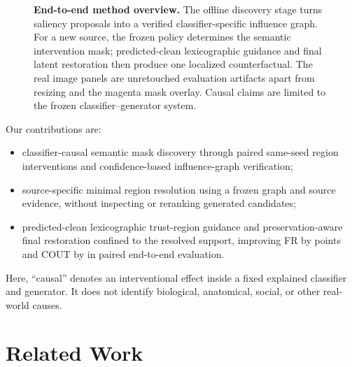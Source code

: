 \documentclass[10pt,twocolumn]{article}
\begin{document}
\begin{figure}[t]
{%
}
\caption{\textbf{End-to-end method overview.} The offline discovery stage
turns saliency proposals into a verified classifier-specific influence graph.
For a new source, the frozen policy determines the semantic intervention mask;
predicted-clean lexicographic guidance and final latent restoration then
produce one localized counterfactual. The real image panels are unretouched
evaluation artifacts apart from resizing and the magenta mask overlay. Causal
claims are limited to the frozen classifier--generator system.}
\label{fig:overview}
\end{figure}

Our contributions are:
\begin{itemize}
  \item classifier-causal semantic mask discovery through paired same-seed
        region interventions and confidence-based influence-graph verification;
  \item source-specific minimal region resolution using a frozen graph and
        source evidence, without inspecting or reranking generated candidates;
  \item predicted-clean lexicographic trust-region guidance and
        preservation-aware final restoration confined to the resolved support,
        improving FR by \EndToEndFRGainPctPoints{} points and COUT by
        \EndToEndCOUTGain{} in paired end-to-end evaluation.
\end{itemize}
Here, ``causal'' denotes an interventional effect inside a fixed explained
classifier and generator. It does not identify biological, anatomical, social,
or other real-world causes.

\section{Related Work}
\end{document}

